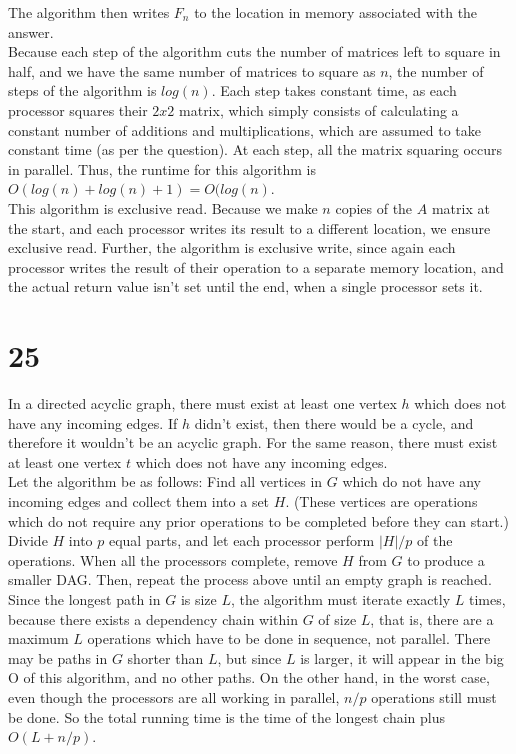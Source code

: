 \documentclass[letterpaper,notitlepage,twoside]{article}
\begin{document}
The algorithm then writes $F_n$ to the location in memory associated with the answer. \\
Because each step of the algorithm cuts the number of matrices left to square in half, and we have the same number of matrices to square as $n$, the number of steps of the algorithm is $log(n)$. Each step takes constant time, as each processor squares their $2x2$ matrix, which simply consists of calculating a constant number of additions and multiplications, which are assumed to take constant time (as per the question). At each step, all the matrix squaring occurs in parallel. Thus, the runtime for this algorithm is $O(log(n) + log(n) + 1) = O(log(n)$. \\
This algorithm is exclusive read. Because we make $n$ copies of the $A$ matrix at the start, and each processor writes its result to a different location, we ensure exclusive read. Further, the algorithm is exclusive write, since again each processor writes the result of their operation to a separate memory location, and the actual return value isn't set until the end, when a single processor sets it. 
\section*{25}
In a directed acyclic graph, there must exist at least one vertex $h$ which does not have any incoming edges. If $h$ didn't exist, then there would be a cycle, and therefore it wouldn't be an acyclic graph. For the same reason, there must exist at least one vertex $t$ which does not have any incoming edges.
\\
Let the algorithm be as follows:
Find all vertices in $G$ which do not have any incoming edges and collect them into a set $H$. (These vertices are operations which do not require any prior operations to be completed before they can start.) Divide $H$ into $p$ equal parts, and let each processor perform $|H|/p$ of the operations. When all the processors complete, remove $H$ from $G$ to produce a smaller DAG. Then, repeat the process above until an empty graph is reached.
\\
Since the longest path in $G$ is size $L$, the algorithm must iterate exactly $L$ times, because there exists a dependency chain within $G$ of size $L$, that is, there are a maximum $L$ operations which have to be done in sequence, not parallel. There may be paths in $G$ shorter than $L$, but since $L$ is larger, it will appear in the big O of this algorithm, and no other paths. On the other hand, in the worst case, even though the processors are all working in parallel, $n/p$ operations still must be done. So the total running time is the time of the longest chain plus $O(L + n/p)$.
\end{document}

